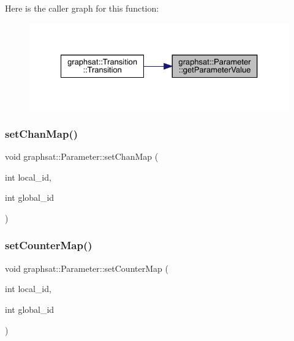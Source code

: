 Here is the caller graph for this function\+:
\nopagebreak
\begin{figure}[H]
\begin{center}
\leavevmode
\includegraphics[width=327pt]{classgraphsat_1_1_parameter_a9f6ef8090aefb3f53ca031b70a9c81c4_icgraph}
\end{center}
\end{figure}
\mbox{\label{classgraphsat_1_1_parameter_a34bcbd7b010a26f7b7f4cf78652fe78d}} 
\subsubsection{\texorpdfstring{setChanMap()}{setChanMap()}}
{\footnotesize\ttfamily void graphsat\+::\+Parameter\+::set\+Chan\+Map (\begin{DoxyParamCaption}\item[{int}]{local\+\_\+id,  }\item[{int}]{global\+\_\+id }\end{DoxyParamCaption})\hspace{0.3cm}{\ttfamily [inline]}}

\mbox{\label{classgraphsat_1_1_parameter_aeb19c4b110f01b846c9e20ae666ca02c}} 
\subsubsection{\texorpdfstring{setCounterMap()}{setCounterMap()}}
{\footnotesize\ttfamily void graphsat\+::\+Parameter\+::set\+Counter\+Map (\begin{DoxyParamCaption}\item[{int}]{local\+\_\+id,  }\item[{int}]{global\+\_\+id }\end{DoxyParamCaption})\hspace{0.3cm}{\ttfamily [inline]}}

